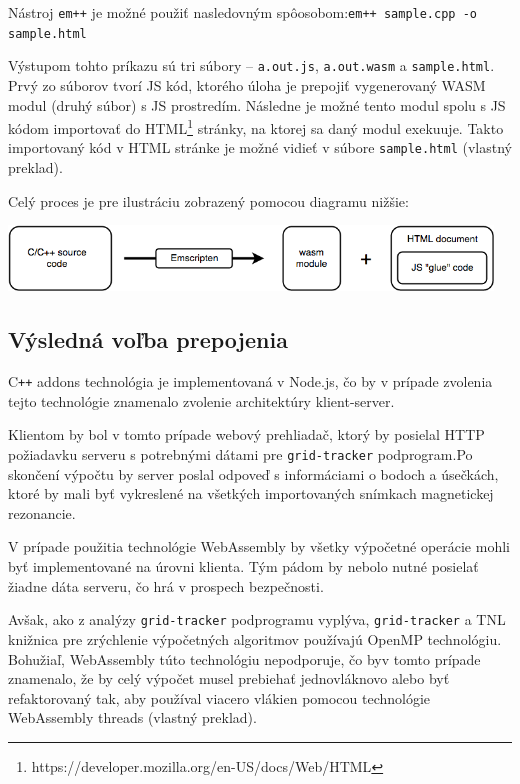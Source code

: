 Nástroj \texttt{em++} je možné použiť nasledovným spôosobom:\newline \texttt{em++ sample.cpp -o sample.html} 

Výstupom tohto príkazu sú tri súbory -- \texttt{a.out.js}, \texttt{a.out.wasm} a \texttt{sample.html}. Prvý zo súborov tvorí JS kód, ktorého úloha je prepojiť vygenerovaný WASM modul (druhý súbor) s JS prostredím. Následne je možné tento modul spolu s JS kódom importovať do HTML\footnote{https://developer.mozilla.org/en-US/docs/Web/HTML} stránky, na ktorej sa daný modul exekuuje. Takto importovaný kód v HTML stránke je možné vidieť v súbore \texttt{sample.html} \cite{cpp_to_wasm} (vlastný preklad).

Celý proces je pre ilustráciu zobrazený pomocou diagramu nižšie:
\begin {center}
        \centering
        \includegraphics[height=1.75cm]{media/graphs/cpp_to_wasm.png}
        \captionsetup{justification=centering}
\end {center}

\subsection {Výsledná voľba prepojenia}
C\texttt{++} addons technológia je implementovaná v Node.js, čo by v prípade zvolenia tejto technológie znamenalo zvolenie architektúry klient-server.

Klientom by bol v tomto prípade webový prehliadač, ktorý by posielal HTTP požiadavku serveru s potrebnými dátami pre \texttt{grid-tracker} podprogram.\newline Po skončení výpočtu by server poslal odpoveď s informáciami o bodoch a úsečkách, ktoré by mali byť vykreslené na všetkých importovaných snímkach magnetickej rezonancie.

V prípade použitia technológie WebAssembly by všetky výpočetné operácie mohli byť implementované na úrovni klienta. Tým pádom by nebolo nutné posielať žiadne dáta serveru, čo hrá v prospech bezpečnosti.

Avšak, ako z analýzy \texttt{grid-tracker} podprogramu vyplýva, \texttt{grid-tracker} a TNL knižnica pre zrýchlenie výpočetných algoritmov používajú OpenMP technológiu. Bohužiaľ, WebAssembly túto technológiu nepodporuje, čo by\newline v tomto prípade znamenalo, že by celý výpočet musel prebiehať jednovláknovo alebo byť refaktorovaný tak, aby používal viacero vlákien pomocou technológie WebAssembly threads \cite{webassembly_threads} (vlastný preklad).

